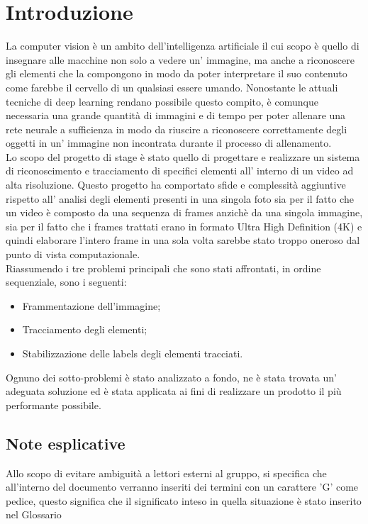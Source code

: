 \section{Introduzione}
La computer vision è un ambito dell'intelligenza artificiale il cui scopo è quello di insegnare alle macchine non solo a vedere un' immagine, ma anche a riconoscere gli elementi che la compongono in modo da poter interpretare il suo contenuto come farebbe il cervello di un qualsiasi essere umando. Nonostante le attuali tecniche di deep learning rendano possibile questo compito, è comunque necessaria una grande quantità di immagini e di tempo per poter allenare una rete neurale a sufficienza in modo da riuscire a riconoscere correttamente degli oggetti in un' immagine non incontrata durante il processo di allenamento.\\

Lo scopo del progetto di stage è stato quello di progettare e realizzare un sistema di riconoscimento e tracciamento di specifici elementi all' interno di un video ad alta risoluzione. Questo progetto ha comportato sfide e complessità aggiuntive rispetto all' analisi degli elementi presenti in una singola foto sia per il fatto che un video è composto da una sequenza di frames anzichè da una singola immagine, sia per il fatto che i frames trattati erano in formato Ultra High Definition (4K) e quindi elaborare l'intero frame in una sola volta sarebbe stato troppo oneroso dal punto di vista computazionale.\\

Riassumendo i tre problemi principali che sono stati affrontati, in ordine sequenziale, sono i seguenti:
\begin{itemize}
\item Frammentazione dell'immagine;
\item Tracciamento degli elementi;
\item Stabilizzazione delle labels degli elementi tracciati.
\end{itemize}
Ognuno dei sotto-problemi è stato analizzato a fondo, ne è stata trovata un' adeguata soluzione ed è stata applicata ai fini di realizzare un prodotto il più performante possibile.

\subsection{Note esplicative}
Allo scopo di evitare ambiguità a lettori esterni al gruppo, si specifica che all'interno del documento verranno inseriti dei termini con un carattere 'G' come pedice, questo significa che il significato inteso in quella situazione è stato inserito nel Glossario
